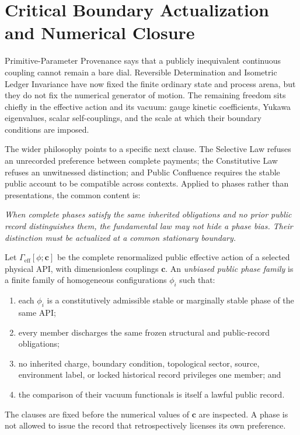 
\section{Critical Boundary Actualization and Numerical Closure}
\label{sec:critical-boundary-actualization}

Primitive-Parameter Provenance says that a publicly inequivalent continuous coupling
cannot remain a bare dial.  Reversible Determination and Isometric Ledger Invariance
have now fixed the finite ordinary state and process arena, but they do not fix the
numerical generator of motion.  The remaining freedom sits chiefly in the effective
action and its vacuum: gauge kinetic coefficients, Yukawa eigenvalues, scalar
self-couplings, and the scale at which their boundary conditions are imposed.

The wider philosophy points to a specific next clause.  The Selective Law refuses an
unrecorded preference between complete payments; the Constitutive Law refuses an
unwitnessed distinction; and Public Confluence requires the stable public account to
be compatible across contexts.  Applied to phases rather than presentations, the
common content is:
\begin{center}
\emph{When complete phases satisfy the same inherited obligations and no prior
public record distinguishes them, the fundamental law may not hide a phase bias.
Their distinction must be actualized at a common stationary boundary.}
\end{center}

\begin{definition}
Let $\Gamma_{\mathrm{eff}}[\phi;\mathbf c]$ be the complete renormalized public
effective action of a selected physical API, with dimensionless couplings
$\mathbf c$.  An \emph{unbiased public phase family} is a finite family of
homogeneous configurations $\phi_i$ such that:
\begin{enumerate}[label=\textup{B\arabic*},leftmargin=2.4em]
\item each $\phi_i$ is a constitutively admissible stable or marginally stable
      phase of the same API;
\item every member discharges the same frozen structural and public-record
      obligations;
\item no inherited charge, boundary condition, topological sector, source,
      environment label, or locked historical record privileges one member; and
\item the comparison of their vacuum functionals is itself a lawful public record.
\end{enumerate}
The clauses are fixed before the numerical values of $\mathbf c$ are inspected.
A phase is not allowed to issue the record that retrospectively licenses its own
preference.
\end{definition}


